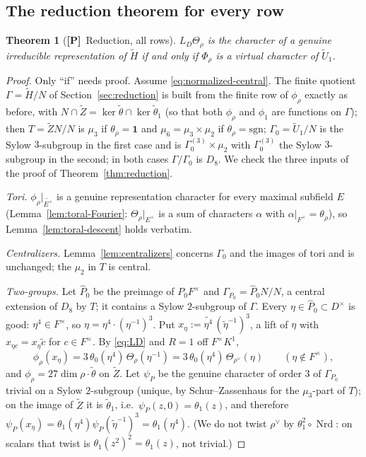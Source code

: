 \documentclass[11pt]{article}
\newcommand{\Nrd}{\operatorname{Nrd}}
\newcommand{\tH}{\widetilde H}
\newcommand{\tZ}{\widetilde Z}
\newcommand{\tU}{\widetilde U}
\newcommand{\tth}{\widetilde\theta}
\newcommand{\Ptag}{\textnormal{\textbf{[P]}}}
\theoremstyle{plain}
\newtheorem{theorem}{Theorem}[section]
\theoremstyle{definition}
\begin{document}
\subsection{The reduction theorem for every row}
\begin{theorem}[\Ptag\ Reduction, all rows]\label{thm:reduction-all}
$L_D\Theta_\rho$ is the character of a genuine irreducible representation
of $\tH$ if and only if $\Phi_\rho$ is a virtual character of $\tU_1$.
\end{theorem}
\begin{proof}
Only ``if'' needs proof.  Assume \eqref{eq:normalized-central}.  The
finite quotient $\Gamma=\tH/N$ of Section~\ref{sec:reduction} is built
from the finite row of $\phi_\rho$ exactly as before, with
$N\cap\tZ=\ker\tth\cap\ker\tth_1$ (so that both $\phi_\rho$ and $\phi_1$
are functions on $\Gamma$); then $T=\tZ N/N$ is $\mu_3$ if
$\theta_\rho=\mathbf1$ and $\mu_6=\mu_3\times\mu_2$ if
$\theta_\rho=\mathrm{sgn}$; $\Gamma_0=\tU_1/N$ is the Sylow
$3$-subgroup in the first case and is $\Gamma_0^{(3)}\times\mu_2$ with
$\Gamma_0^{(3)}$ the Sylow $3$-subgroup in the second; in both cases
$\Gamma/\Gamma_0$ is $D_8$.  We check the three inputs of the proof
of Theorem~\ref{thm:reduction}.

\emph{Tori.}  $\phi_\rho|_{\widetilde{E^\times}}$ is a genuine
representation character for every maximal subfield $E$
(Lemma~\ref{lem:toral-Fourier}: $\Theta_\rho|_{E^\times}$ is a sum of
characters $\alpha$ with $\alpha|_{F^\times}=\theta_\rho$), so
Lemma~\ref{lem:toral-descent} holds verbatim.

\emph{Centralizers.}  Lemma~\ref{lem:centralizers} concerns $\Gamma_0$
and the images of tori and is unchanged; the $\mu_2$ in $T$ is central.

\emph{Two-groups.}  Let $\hat P_0$ be the preimage of $P_0F^\times$ and
$\Gamma_{P_0}=\hat P_0N/N$, a central extension of $D_8$ by $T$; it
contains a Sylow $2$-subgroup of $\Gamma$.  Every $\eta\in\hat P_0\subset D^\times$
is good: $\eta^4\in F^\times$, so $\eta=\eta^4\cdot(\eta^{-1})^3$.  Put
$x_\eta:=\widetilde{\eta^4}\,(\tilde\eta^{-1})^3$, a lift of $\eta$ with
$x_{\eta c}=x_\eta\tilde c$ for $c\in F^\times$.  By \eqref{eq:LD} and $R=1$
off $F^\times K^1$,
\[
 \phi_\rho(x_\eta)=3\,\theta_0(\eta^4)\,\Theta_\rho(\eta^{-1})
 =3\,\theta_0(\eta^4)\,\Theta_{\rho^\vee}(\eta)\qquad(\eta\notin F^\times),
\]
and $\phi_\rho=27\dim\rho\cdot\tth$ on $\tZ$.  Let $\psi_P$ be the
genuine character of order $3$ of $\Gamma_{P_0}$ trivial on a Sylow
$2$-subgroup (unique, by Schur--Zassenhaus for the $\mu_3$-part of $T$);
on the image of $\tZ$ it is $\tth_1$, i.e.\ $\psi_P(z,0)=\theta_1(z)$, and
therefore $\psi_P(x_\eta)=\theta_1(\eta^4)\psi_P(\tilde\eta^{-1})^3=\theta_1(\eta^4)$.
(We do not twist $\rho^\vee$ by $\theta_1^2\circ\Nrd$: on scalars that
twist is $\theta_1(z^2)^2=\theta_1(z)$, not trivial.)


\end{proof}
\end{document}

